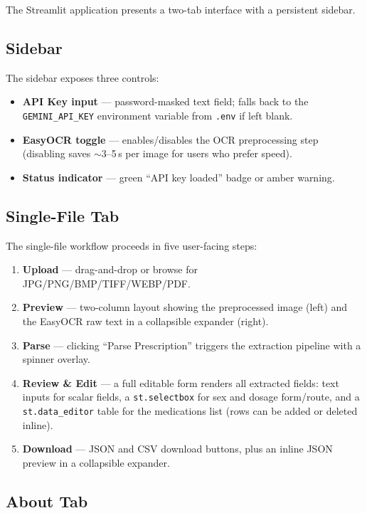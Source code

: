 \documentclass[12pt,a4paper]{article}
\begin{document}
The Streamlit application presents a two-tab interface with a persistent sidebar.

\subsection{Sidebar}

The sidebar exposes three controls:
\begin{itemize}[noitemsep]
    \item \textbf{API Key input} — password-masked text field; falls back to the
          \texttt{GEMINI\_API\_KEY} environment variable from \texttt{.env} if left blank.
    \item \textbf{EasyOCR toggle} — enables/disables the OCR preprocessing step
          (disabling saves $\sim$3--5\,s per image for users who prefer speed).
    \item \textbf{Status indicator} — green ``API key loaded'' badge or amber warning.
\end{itemize}

\subsection{Single-File Tab}

The single-file workflow proceeds in five user-facing steps:

\begin{enumerate}[noitemsep]
    \item \textbf{Upload} — drag-and-drop or browse for JPG/PNG/BMP/TIFF/WEBP/PDF.
    \item \textbf{Preview} — two-column layout showing the preprocessed image
          (left) and the EasyOCR raw text in a collapsible expander (right).
    \item \textbf{Parse} — clicking ``Parse Prescription'' triggers the extraction
          pipeline with a spinner overlay.
    \item \textbf{Review \& Edit} — a full editable form renders all extracted fields:
          text inputs for scalar fields, a \texttt{st.selectbox} for sex and dosage
          form/route, and a \texttt{st.data\_editor} table for the medications list
          (rows can be added or deleted inline).
    \item \textbf{Download} — JSON and CSV download buttons, plus an inline JSON
          preview in a collapsible expander.
\end{enumerate}

\subsection{About Tab}
\end{document}
